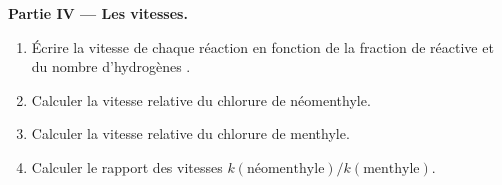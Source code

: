 \begin{problem}
\medskip
\noindent\textbf{Partie IV --- Les vitesses.}
\begin{enumerate}[resume]
  \item Écrire la vitesse de chaque réaction en fonction de la fraction
        de  réactive et du nombre d'hydrogènes .
  \item Calculer la vitesse relative du chlorure de néomenthyle.
  \item Calculer la vitesse relative du chlorure de menthyle.
  \item Calculer le rapport des vitesses $k(\text{néomenthyle})/k(\text{menthyle})$.
\end{enumerate}
\end{problem}
